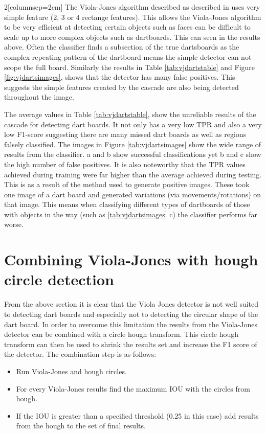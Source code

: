 \documentclass{article}
\begin{document}
\begin{multicols}{2}[columnsep=2cm]
The Viola-Jones algorithm described as described in \cite{vj} uses very simple feature (2, 3 or 4 rectange features). This allows the Viola-Jones algorithm to be very efficient at detecting certain objects such as faces can be difficult to scale up to more complex objects such as dartboards. This can seen in the results above. Often the classifier finds a subsection of the true dartsboards as the complex repeating pattern of the dartboard means the simple detector can not scope the full board. Similarly the results in Table \ref{tab:vjdartstable} and Figure \ref{fig:vjdartsimages}, shows that the detector has many false positives. This suggests the simple features created by the cascade are also being detected throughout the image.

The average values in Table \ref{tab:vjdartstable}, show the unreliable results of
the cascade for detecting dart boards.  It not only has a very low TPR and also
a very low F1-score suggesting there are many missed dart boards as well as
regions falsely classified. The images in Figure \ref{tab:vjdartsimages} show
the wide range of results from the classifier. a and b show successful
classifications yet b and c show the high number of false positives. It is also
noteworthy that the TPR values achieved during training were far higher than
the average achieved during testing. This is as a result of the method used to
generate positive images. These took one image of a dart board and generated
variations (via movements/rotations) on that image. This means when classifying
different types of dartboards of those with objects in the way (such as
\ref{tab:vjdartsimages} c) the classifier performs far worse.

\section{Combining Viola-Jones with hough circle detection}

From the above section it is clear that the Viola Jones detector is not well
suited to detecting dart boards and especially not to detecting the circular
shape of the dart board. In order to overcome this limitation the results from
the Viola-Jones detector can be combined with a circle hough transform. This
circle hough transform can then be used to shrink the results set and increase
the F1 score of the detector. The combination step is as follows:

\begin{itemize}
  \item Run Viola-Jones and hough circles.
  \item For every Viola-Jones results find the maximum IOU with the circles
    from hough. 
  \item If the IOU is greater than a specified threshold (0.25 in this case)
    add results from the hough to the set of final results. 
\end{itemize} 


\end{multicols}
\end{document}
